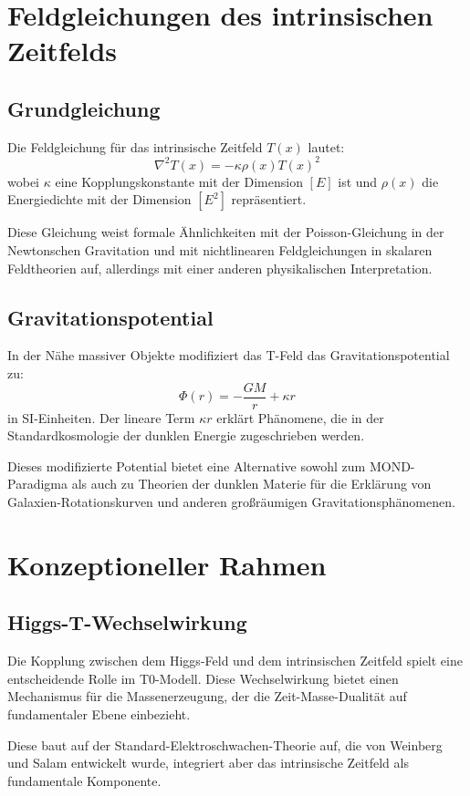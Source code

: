 \documentclass[a4paper,12pt]{article}
\newcommand{\Tfield}{T(x)}
\begin{document}
	\section{Feldgleichungen des intrinsischen Zeitfelds}
	
	\subsection{Grundgleichung}
	Die Feldgleichung für das intrinsische Zeitfeld $\Tfield$ lautet:
	\[
	\nabla^2 \Tfield = -\kappa \rho(x) \Tfield^2
	\]
	wobei $\kappa$ eine Kopplungskonstante mit der Dimension $[E]$ ist und $\rho(x)$ die Energiedichte mit der Dimension $[E^2]$ repräsentiert.
	
	Diese Gleichung weist formale Ähnlichkeiten mit der Poisson-Gleichung in der Newtonschen Gravitation \cite{Poisson1823} und mit nichtlinearen Feldgleichungen in skalaren Feldtheorien \cite{Rajaraman1982} auf, allerdings mit einer anderen physikalischen Interpretation.
	
	\subsection{Gravitationspotential}
	In der Nähe massiver Objekte modifiziert das T-Feld das Gravitationspotential zu:
	\[
	\Phi(r) = -\frac{GM}{r} + \kappa r
	\]
	in SI-Einheiten. Der lineare Term $\kappa r$ erklärt Phänomene, die in der Standardkosmologie der dunklen Energie zugeschrieben werden.
	
	Dieses modifizierte Potential bietet eine Alternative sowohl zum MOND-Paradigma \cite{Milgrom1983} als auch zu Theorien der dunklen Materie \cite{Bertone2005} für die Erklärung von Galaxien-Rotationskurven und anderen großräumigen Gravitationsphänomenen.
	
	\section{Konzeptioneller Rahmen}
	
	\subsection{Higgs-T-Wechselwirkung}
	Die Kopplung zwischen dem Higgs-Feld und dem intrinsischen Zeitfeld spielt eine entscheidende Rolle im T0-Modell. Diese Wechselwirkung bietet einen Mechanismus für die Massenerzeugung, der die Zeit-Masse-Dualität auf fundamentaler Ebene einbezieht.
	
	Diese baut auf der Standard-Elektroschwachen-Theorie auf, die von Weinberg \cite{Weinberg1967} und Salam \cite{Salam1968} entwickelt wurde, integriert aber das intrinsische Zeitfeld als fundamentale Komponente.
	
\end{document}
